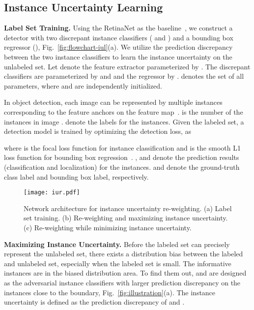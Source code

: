 \documentclass[final]{cvpr}
\begin{document}
\subsection{Instance Uncertainty Learning}

\textbf{Label Set Training.} Using the RetinaNet as the baseline~\cite{RetinaNet20}, we construct a detector with two discrepant instance classifiers ( and ) and a bounding box regressor (), Fig.~\ref{fig:flowchart-iul}(a). We utilize the prediction discrepancy between the two instance classifiers to learn the instance uncertainty on the unlabeled set. Let  denote the feature extractor parameterized by . The discrepant classifiers are parameterized by  and  and the regressor by .  denotes the set of all parameters, where  and  are independently initialized.

In object detection, each image  can be represented by multiple instances  corresponding to the feature anchors on the feature map~\cite{RetinaNet20}.  is the number of the instances in image .  denote the labels for the instances. Given the labeled set, a detection model is trained by optimizing the detection loss, as

where  is the focal loss function for instance classification and  is the smooth L1 loss function for bounding box regression~\cite{RetinaNet20}. ,  and  denote the prediction results (classification and localization) for the instances.  and  denote the ground-truth class label and bounding box label, respectively. 

\begin{figure*}[t]
    \centering
    \texttt{[image: iur.pdf]}
    \caption{Network architecture for instance uncertainty re-weighting. (a) Label set training. (b) Re-weighting and maximizing instance uncertainty. (c) Re-weighting while minimizing instance uncertainty.}
    \label{fig:flowchart-iur}
\end{figure*}

\textbf{Maximizing Instance Uncertainty.} Before the labeled set can precisely represent the unlabeled set, there exists a distribution bias between the labeled and unlabeled set, especially when the labeled set is small. The informative instances are in the biased distribution area.
To find them out,  and  are designed as the adversarial instance classifiers with larger prediction discrepancy on the instances close to the boundary, Fig.~\ref{fig:illustration}(a). The instance uncertainty is defined as the prediction discrepancy of  and .
\end{document}
